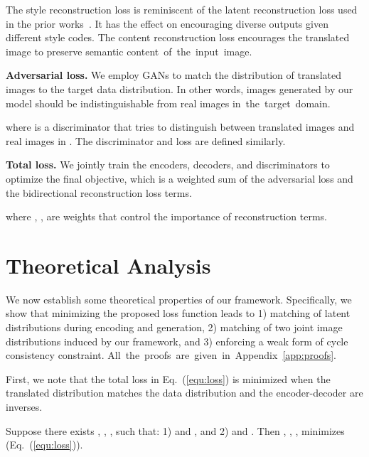 \documentclass[runningheads]{llncs}
\newcommand{\vpara}[1]{\vspace{0.05in}\noindent\textbf{#1}}
\begin{document}
	The style reconstruction loss  is reminiscent of the latent reconstruction loss used in the prior works~\cite{zhu2017toward,huang2017sgan,srivastava2017veegan,chen2016infogan}. It has the effect on encouraging diverse outputs given different style codes. The content reconstruction loss  encourages the translated image to preserve semantic \mbox{content of the input image.}

	\vpara{Adversarial loss.} We employ GANs to match the distribution of translated images to the target data distribution. In other words, images generated by our model should be indistinguishable from real images \mbox{in the target domain.}
	
	where  is a discriminator that tries to distinguish between translated images and real images in . The discriminator  and loss  are defined similarly.
	
	\vpara{Total loss.} We jointly train the encoders, decoders, and discriminators to optimize the final objective, which is a weighted sum of the adversarial loss and the bidirectional reconstruction loss terms.
	
	where , ,  are weights that control the importance of reconstruction terms.
	
	\section{Theoretical Analysis}
	\label{sec:theory}
	We now establish some theoretical properties of our framework. Specifically, we show that minimizing the proposed loss function leads to 1) matching of latent distributions during encoding and generation, 2) matching of two joint image distributions induced by our framework, and 3) enforcing a weak form of cycle consistency constraint. \mbox{All the proofs are given in Appendix~\ref{app:proofs}.}
	
	First, we note that the total loss in Eq.~(\ref{equ:loss}) is minimized when the translated distribution matches the data distribution and the encoder-decoder are inverses.
	\begin{proposition}
		Suppose there exists , , ,  such that: 1)  and , and 2)  and . Then , , ,  minimizes  (Eq.~(\ref{equ:loss})).
\end{proposition}
\end{document}
